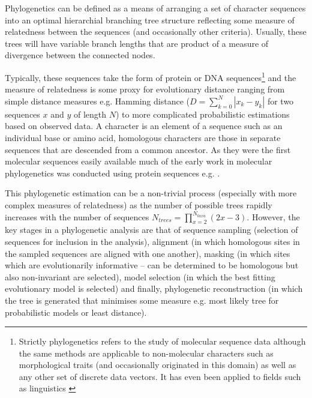 Phylogenetics can be defined as a means of arranging a set of character sequences into an optimal hierarchial
branching tree structure reflecting some measure of relatedness 
between the sequences (and occasionally other criteria). Usually, these trees will have variable
branch lengths that are product of a measure of divergence between the connected nodes.

Typically, these sequences take the form of protein or DNA sequences\footnote{
Strictly phylogenetics refers to the study of molecular sequence data although the same methods are applicable to
non-molecular characters such as morphological traits (and occasionally originated in this domain) as well as any
other set of discrete data vectors. It has even been applied to fields such as linguistics \citep{}
} and the measure of relatedness is some proxy for evolutionary distance ranging from simple distance measures 
e.g. Hamming distance (\(D = \sum_{k=0}^{N}|x_{k} - y_{k}|\) for two sequences \(x\) and \(y\) of length \(N\))
to more complicated probabilistic estimations based on observed data.
A character is an element of a sequence such as an individual base or amino acid, homologous 
characters are those in separate sequences that are descended from a common ancestor.  
As they were the first molecular sequences easily available much of the early work in molecular phylogenetics
was conducted using protein sequences e.g. \citep{eck1966atlas,Fitch1967}.

This phylogenetic estimation can be a non-trivial process (especially with more complex
measures of relatedness) as the number of
possible trees rapidly increases with the number of sequences \(N_{trees} = \prod_{x=2}^{N_{taxa}} (2x - 3)\).
However, the key stages in a phylogenetic analysis are that of sequence sampling (selection of
sequences for inclusion in the analysis),  alignment (in which homologous sites in the sampled sequences are aligned with one another),
 masking (in which sites which are evolutionarily informative – can be determined to be homologous 
     but also non-invariant are selected), model selection (in which the best fitting
 evolutionary model is selected) and finally, phylogenetic reconstruction (in which the tree
 is generated that minimises some measure e.g. most likely tree for probabilistic models or 
 least distance).


